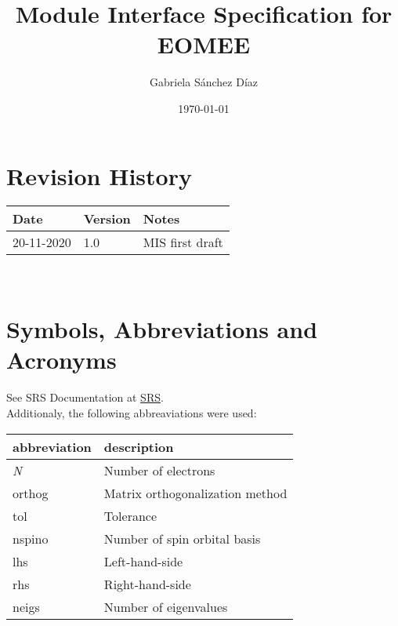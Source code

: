 \documentclass[12pt, titlepage]{article}
\begin{document}
\title{Module Interface Specification for EOMEE}

\author{Gabriela S\'anchez D\'iaz}

\date{\today}

\maketitle


\section{Revision History}

\begin{tabularx}{\textwidth}{p{3cm}p{2cm}X}
\toprule {\bf Date} & {\bf Version} & {\bf Notes}\\
\midrule
20-11-2020 & 1.0 & MIS first draft\\
\bottomrule
\end{tabularx}

~\newpage

\section{Symbols, Abbreviations and Acronyms}

See SRS Documentation at 
\href{https://github.com/gabrielasd/eomee/tree/cas741/docs/SRS/}{SRS}.\\
Additionaly, the following abbreaviations were used:
\noindent \begin{longtable*}{l p{5cm}} \toprule
	\textbf{abbreviation} & \textbf{description}\\
	\midrule 
	\textit{N} & Number of electrons\\ 
	orthog & Matrix orthogonalization method\\
	tol & Tolerance\\
	nspino & Number of spin orbital basis\\
	lhs & Left-hand-side\\
	rhs & Right-hand-side\\
	neigs & Number of eigenvalues\\
\end{longtable*}


\newpage

\tableofcontents
\end{document}
